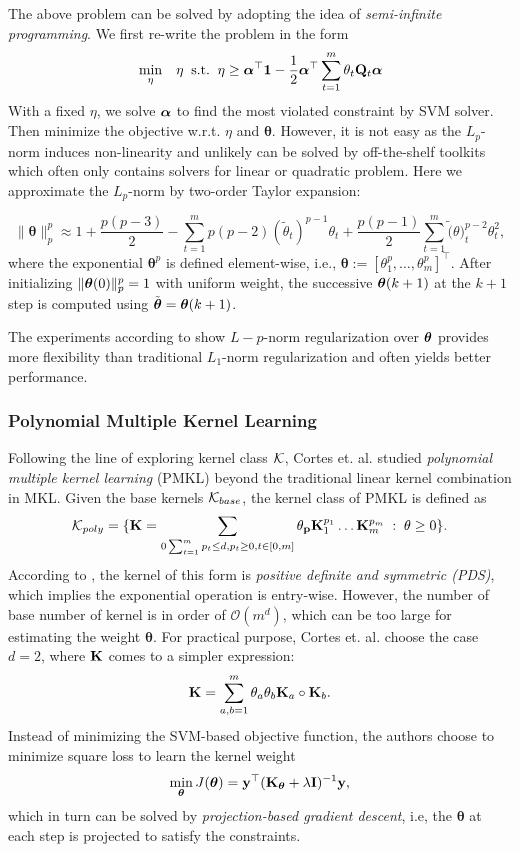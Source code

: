 The above problem can be solved by adopting the idea of {\em semi-infinite programming}\cite{jmlr/SonnenburgRSS06}. We first re-write the problem in the form
 \begin{eqnarray}
 &\min_{\eta}& \eta \;\;{\mbox{s.t.}}\;\; \eta \geq {\boldsymbol{\alpha}}^\top\mathbf{1} - \frac{1}{2}{\boldsymbol{\alpha}}^\top\sum_{t=1}^{m}\theta_t\mathbf Q_t{\boldsymbol{\alpha}} \nonumber\\
 \end{eqnarray}
With a fixed $\eta$, we solve ${\boldsymbol{\alpha}}$ to find the most violated constraint by SVM solver. Then minimize the objective w.r.t. $\eta$ and $\bm\theta$. However, it is not easy as the $L_p$-norm induces non-linearity and unlikely can be solved by off-the-shelf toolkits which often only contains solvers for linear or quadratic problem. Here we approximate the $L_p$-norm by two-order Taylor expansion\cite{nips/KloftBSLMZ09}:

\[
\| \bm\theta \|^p_p \approx 1 + \frac{p(p - 3)}{2} - \sum_{t=1}^{m}p(p - 2)(\tilde{\theta}_t)^{p - 1}\theta_t + \frac{p(p - 1)}{2}\sum_{t = 1}^{m}\tilde(\theta)_t^{p - 2}\theta_t^2,
\]
where the exponential $\bm\theta^p$ is defined element-wise, i.e., $\bm\theta := [\theta_1^p,\ldots,\theta_{m}^p]^\top$. After initializing $\|{\boldsymbol{\theta}}(0)\|^p_p=1$ with uniform weight, the successive ${\boldsymbol{\theta}}(k + 1)$ at the $k+1$ step is computed using $\tilde{{\boldsymbol{\theta}}} = {\boldsymbol{\theta}}(k + 1)$.

The experiments according to \cite{nips/KloftBSLMZ09} show $L-p$-norm regularization over ${\boldsymbol{\theta}}$ provides more flexibility than traditional $L_1$-norm regularization and often yields better performance.

\subsubsection{Polynomial Multiple Kernel Learning}

Following the line of exploring kernel class ${\cal K}$, Cortes et. al. studied {\em polynomial multiple kernel learning} (PMKL) beyond the traditional linear kernel combination in MKL. Given the base kernels ${\cal K}_{base}$, the kernel class of PMKL is defined as
\[
{\cal K}_{poly}=\{ {\mathbf K} = \sum_{0\sum_{t=1}^{m}p_t\leq d, p_t \geq 0, t\in[0,m]}\theta_{\mathbf p}{\mathbf K}_1^{p_1}\ldots{\mathbf K}_{m}^{p_{m}}\;:\;\theta \geq 0 \}.
\]
According to \cite{nips/CortesMR09}, the kernel of this form is {\em positive definite and symmetric (PDS)}, which implies the exponential operation is entry-wise. However, the number of base number of kernel is in order of $\mathcal O(m^d)$, which can be too large for estimating the weight $\bm\theta$. For practical purpose, Cortes et. al. choose the case $d=2$, where ${\mathbf K}$ comes to a simpler expression:
\[
{\mathbf K} = \sum_{a,b=1}^{m}\theta_a\theta_b{\mathbf K}_a\circ{\mathbf K}_b.
\]
Instead of minimizing the SVM-based objective function, the authors choose to minimize square loss to learn the kernel weight
\[
\min_{\boldsymbol{\theta}} J(\boldsymbol{\theta}) = \mathbf{y}^\top({\mathbf K}_{\boldsymbol{\theta}} + \lambda\mathbf I)^{-1}\mathbf{y},
\]
which in turn can be solved by {\em projection-based gradient descent}, i.e, the $\bm\theta$ at each step is projected to satisfy the constraints.

